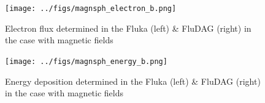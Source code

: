 \begin{figure}[ht!]
 \begin{centering}
 \centering
 \texttt{[image: ../figs/magnsph\_electron\_b.png]}
 \caption{Electron flux determined in the Fluka (left) \& FluDAG (right) in the
          case with magnetic fields}
 \label{fig:magnsph_electron_b}
 \end{centering}
\end{figure}

\begin{figure}[ht!]
 \begin{centering}
 \centering
 \texttt{[image: ../figs/magnsph\_energy\_b.png]}
 \caption{Energy deposition determined in the Fluka (left) \& FluDAG (right) in
          the case with magnetic fields}
 \label{fig:magnsph_energy_b}
 \end{centering}
\end{figure}

\clearpage
